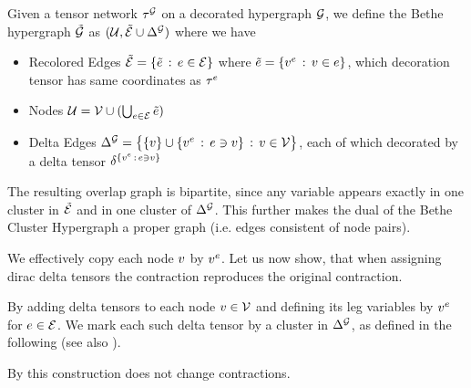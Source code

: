 \begin{definition}
        Given a tensor network $\tau^{\mathcal{G}}$ on a decorated hypergraph $\mathcal{G}$, we define the Bethe hypergraph $\tilde{\mathcal{G}}$ as
        $(\mathcal{U}, \tilde{\mathcal{E}} \cup \Delta^{\mathcal{G}})$ where we have
        \begin{itemize}
            \item Recolored Edges $\tilde{\mathcal{E}} = \{\tilde{e} \,:\, e\in \mathcal{E}\}$ where $\tilde{e} = \{v^{e} \,:\, v\in e\}$, which decoration tensor has same coordinates as $\tau^{e}$
            \item Nodes $\mathcal{U} = \mathcal{V} \cup (\bigcup_{e\in\mathcal{E}}\tilde{e})$ %
            \item Delta Edges $\Delta^{\mathcal{G}} =  \big\{ \{v\} \cup \{v^{e} \,:\, e\ni v \}\,:\, v\in\mathcal{V} \big\} $, each of which decorated by a delta tensor $\delta^{\{v^{e} \,:\, e\ni v \}}$
        \end{itemize}
\end{definition}

The resulting overlap graph is bipartite, since any variable appears exactly in one cluster in $\tilde{\mathcal{E}}$ and in one cluster of $\Delta^{\mathcal{G}}$.
This further makes the dual of the Bethe Cluster Hypergraph a proper graph (i.e. edges consistent of node pairs).

We effectively copy each node $v$ by $v^{e}$.
Let us now show, that when assigning dirac delta tensors the contraction reproduces the original contraction.

By adding delta tensors to each node $v\in\mathcal{V}$ and defining its leg variables by $v^{e}$ for $e\in\mathcal{E}$.
We mark each such delta tensor by a cluster in $\Delta^{\mathcal{G}}$, as defined in the following (see also ).

By  this construction does not change contractions.

